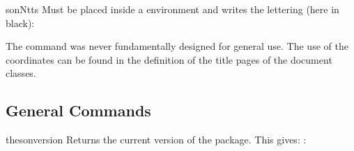 \documentclass{sopra-base}
\begin{document}
\begin{command}{sonNtts}{}
    Must be placed inside a  environment and writes the lettering (here in black):
    \begin{center}
    \end{center}
    The command was never fundamentally designed for general use. The use of the coordinates can be found in the definition of the title pages of the document classes.
\end{command}

\subsection{General Commands}
\begin{command}{thesonversion}{}
    Returns the current version of the package. This gives: : \thesonversion\\
\end{command}
\end{document}
